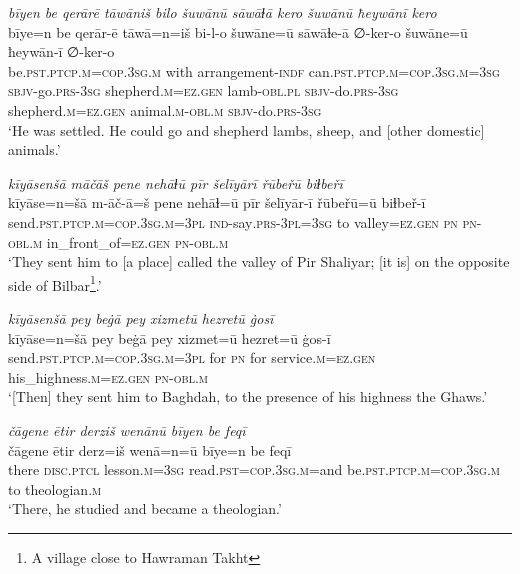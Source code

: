 \ea \label{ZP.9}
\textit{bīyen be qerārē tāwāniš bilo šuwānū sāwāɫā kero šuwānū ħeywānī kero} \\ 
\gll bīye=n be qerār-ē tāwā=n=iš bi-l-o šuwāne=ū sāwāɫe-ā ∅-ker-o šuwāne=ū ħeywān-ī ∅-ker-o \\ 
 be\textsc{.pst}\textsc{.ptcp}\textsc{.m}\textsc{=cop}\textsc{.3sg}\textsc{.m} with arrangement\textsc{-indf} can\textsc{.pst}\textsc{.ptcp}\textsc{.m}\textsc{=cop}\textsc{.3sg}\textsc{.m}\textsc{=3sg} \textsc{sbjv-}go\textsc{.prs}\textsc{-3sg} shepherd\textsc{.m}\textsc{\textsc{=ez.gen}} lamb\textsc{-obl}\textsc{.pl} \textsc{sbjv-}do\textsc{.prs}\textsc{-3sg} shepherd\textsc{.m}\textsc{\textsc{=ez.gen}} animal\textsc{.m}\textsc{-obl}\textsc{.m} \textsc{sbjv-}do\textsc{.prs}\textsc{-3sg} \\ 
\glt `He was settled. He could go and shepherd lambs, sheep, and [other domestic] animals.'
\z 
 
\ea \label{ZP.10}
\textit{kīyāsenšā māčāš pene nehāɫū pīr šelīyārī řūbeřū biɫbeřī} \\ 
\gll kīyāse=n=šā m-āč-ā=š pene nehāɫ=ū pīr šelīyār-ī řūbeřū=ū biɫbeř-ī \\ 
 send\textsc{.pst}\textsc{.ptcp}\textsc{.m}\textsc{=cop}\textsc{.3sg}\textsc{.m}\textsc{=3pl} \textsc{ind-}say\textsc{.prs}\textsc{-3pl}\textsc{=3sg} to valley\textsc{\textsc{=ez.gen}} \textsc{pn} \textsc{pn}\textsc{-obl}\textsc{.m} in\_front\_of\textsc{\textsc{=ez.gen}} \textsc{pn}\textsc{-obl}\textsc{.m} \\ 
\glt `They sent him to [a place] called the valley of Pir Shaliyar; [it is] on the opposite side of Bilbar\footnote{A village close to Hawraman Takht}.'
\z 
 
\ea \label{ZP.14}
\textit{kīyāsenšā pey beġā pey xizmetū hezretū ġosī} \\ 
\gll kīyāse=n=šā pey beġā pey xizmet=ū hezret=ū ġos-ī \\ 
 send\textsc{.pst}\textsc{.ptcp}\textsc{.m}\textsc{=cop}\textsc{.3sg}\textsc{.m}\textsc{=3pl} for \textsc{pn} for service\textsc{.m}\textsc{\textsc{=ez.gen}} his\_highness\textsc{.m}\textsc{\textsc{=ez.gen}} \textsc{pn}\textsc{-obl}\textsc{.m} \\ 
\glt `[Then] they sent him to Baghdah, to the presence of his highness the Ghaws.'
\z 
 
\ea \label{ZP.15}
\textit{čāgene ētir derziš wenānū bīyen be feqī} \\ 
\gll čāgene ētir derz=iš wenā=n=ū bīye=n be feqī \\ 
 there \textsc{disc.ptcl} lesson\textsc{.m}\textsc{=3sg} read\textsc{.pst}\textsc{=cop}\textsc{.3sg}\textsc{.m}=and be\textsc{.pst}\textsc{.ptcp}\textsc{.m}\textsc{=cop}\textsc{.3sg}\textsc{.m} to theologian\textsc{.m} \\ 
\glt `There, he studied and became a theologian.'
\z 
 

